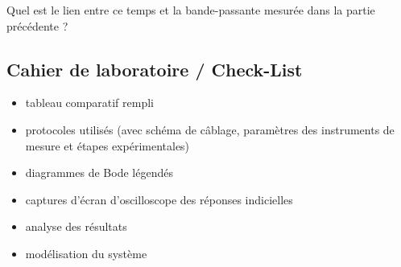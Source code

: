 \Quest Quel est le lien entre ce temps et la bande-passante mesurée dans la partie précédente ?


\subsection{Cahier de laboratoire / Check-List}

\begin{itemize}[label=$\square$]
	\item tableau comparatif rempli
	\item protocoles utilisés (avec schéma de câblage, paramètres des instruments de mesure et étapes expérimentales)
	\item diagrammes de Bode légendés
	\item captures d'écran d'oscilloscope des réponses indicielles
	\item analyse des résultats
	\item modélisation du système
\end{itemize}




